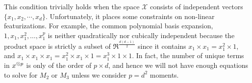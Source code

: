 This condition trivially holds when the space $\mathcal{X}$ consists of
independent vectors $\{ x_1, x_2, \cdots, x_d \}$. Unfortunately, it
places some constraints on non-linear featurizations. For example, the
common polynomial basis expansion, $1, x_1, x_1^2, \dots, x_1^p$ is
neither quadratically nor cubically independent because the product
space is strictly a subset of $\Re^{\frac{d (d-1)}{2}}$ since it
contains $x_1 \times x_1 = x_1^2 \times 1$, and $x_1 \times x_1 \times
x_1 = x_1^2 \times x_1 \times 1 = x_1^3 \times 1 \times 1$. In fact, the
number of unique terms in $x^{\otimes p}$ is only of the order of $p \times
d$, and hence we will not have enough equations to solve for $M_2$ or
$M_3$ unless we consider $p = d^2$ moments.




% 

